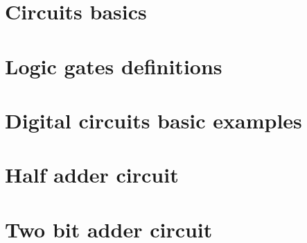 \section*{Circuits basics}

\vfill
\section*{Logic gates definitions}

\vfill
\section*{Digital circuits basic examples}

\vfill
\section*{Half adder circuit}

\vfill
\section*{Two bit adder circuit}

\vfill
